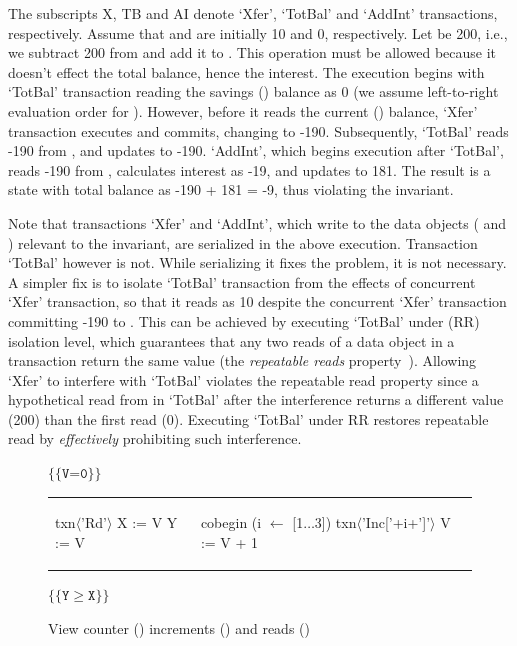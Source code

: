The subscripts X, TB and AI denote `Xfer', `TotBal' and `AddInt'
transactions, respectively. Assume that  and  are initially
10 and 0, respectively. Let  be 200, i.e., we subtract 200 from
 and add it to .  This operation must be allowed because it
doesn't effect the total balance, hence the interest. The execution
begins with `TotBal' transaction reading the savings () balance
as 0 (we assume left-to-right evaluation order for ).
However, before it reads the current () balance, `Xfer'
transaction executes and commits, changing  to -190.
Subsequently, `TotBal' reads -190 from , and updates  to
-190. `AddInt', which begins execution after `TotBal', reads -190 from
, calculates interest as -19, and updates  to 181. The
result is a state with total balance as -190 + 181 = -9, thus
violating the invariant.

Note that transactions `Xfer' and `AddInt', which write to the data
objects ( and ) relevant to the invariant, are serialized in
the above execution. Transaction `TotBal' however is not. While
serializing it fixes the problem, it is not necessary. A simpler fix
is to isolate `TotBal' transaction from the effects of concurrent
`Xfer' transaction, so that it reads  as 10 despite the
concurrent `Xfer' transaction committing -190 to . This can be
achieved by executing `TotBal' under  (RR)
isolation level, which guarantees that any two reads of a data object
in a transaction return the same value (the \emph{repeatable reads}
property~\cite{berenson}). Allowing `Xfer' to interfere with `TotBal'
violates the repeatable read property since a hypothetical read from
 in `TotBal' after the interference returns a different value
(200) than the first read (0). Executing `TotBal' under RR restores
repeatable read by \emph{effectively} prohibiting such interference.

\begin{figure}[t]
\centering
\hspace*{-0.3in}$\{\{\texttt{V=0}\}\}$
\begin{tabular}{l||l}
\begin{txnimpcode}
  txn$\langle$'Rd'$\rangle${
    X := V
    Y := V
  }
\end{txnimpcode}
&
\begin{txnimpcode}
  cobegin (i $\leftarrow$ [1$\ldots$3]) {
    txn$\langle$'Inc['+i+']'$\rangle${
      V := V + 1
    }
  }
\end{txnimpcode}
\\
\end{tabular}
\hspace*{-0.3in}$\{\{\texttt{Y}\ge\texttt{X}\}\}$

\caption{View counter () increments () and reads ()}
\label{fig:motiv-eg-4}
\end{figure}

